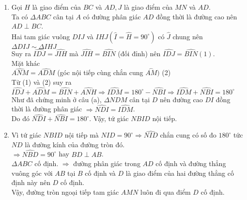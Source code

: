 \begin{ex}
{\begin{enumerate}
		Suy ra $I,D$ thuộc đường trung trực của đoạn thẳng $MN $. \\
		Do đó $DI\perp MN $. 
	\item 	Gọi $H$ là giao điểm của $BC$ và $AD,J$ là giao điểm của $MN$ và $AD. $ \\
	Ta có $\Delta ABC$ cân tại $A$ có đường phân giác $AD$ đồng thời là đường cao nên $AD\perp BC$.\\ 
					Hai tam giác vuông $DIJ$ và $IHJ (\widehat{I}=\widehat{H}=90^\circ)$ có $\widehat{J}$ chung nên $\Delta DIJ\sim \Delta IHJ$ \\
					Suy ra $\widehat{IDJ}=\widehat{JIH}$ mà $\widehat{JIH}=\widehat{BIN}$ (đối đỉnh) nên $\widehat{IDJ}=\widehat{BIN}(1)$.\\
					Mặt khác\\
					 $\widehat{ANM}=\widehat{{ADM}}$ (góc nội tiếp cùng chắn cung $\overset\frown{AM})$ (2)\\
					Từ (1) và (2) suy ra\\ $\widehat{IDJ}+\widehat{ADM}=\widehat{BIN}+\widehat{ANH}\Rightarrow \widehat{IDM}=180^\circ-\widehat{NBI}\Rightarrow \widehat{IDM}+\widehat{NBI}=180^\circ$ \\
					Như đã chứng minh ở câu (a), $\Delta NDM$ cân tại $D$ nên đường cao $DI$ đồng thời là đường phân giác $\Rightarrow \widehat{NDI}=\widehat{IDM}$.\\
					 Do đó $\widehat{NDI}+\widehat{NBI}=180^\circ $. Vậy, tứ giác $NBID$ nội tiếp.
					\item 	Vì tứ giác $NBID$ nội tiếp mà $\widehat{NID}=90^\circ \Rightarrow \widehat{NID}$ chắn cung có số đo $180^\circ$ tức $ND$ là đường kính của đường tròn đó.\\
		 $\Rightarrow \widehat{NBD}=90^\circ$ hay $BD\perp AB$.\\
		$\Delta ABC$ cố định. $\Rightarrow $ đường phân giác trong $AD$ cố định và đường thẳng vuông góc với $AB$ tại $B$ cố định và $D$ là giao điểm của hai đường thẳng cố định này nên $D$ cố định.\\
		Vậy, đường tròn ngoại tiếp tam giác $AMN$ luôn đi qua điểm $D$ cố định.			
	\end{enumerate}}
\end{ex}

